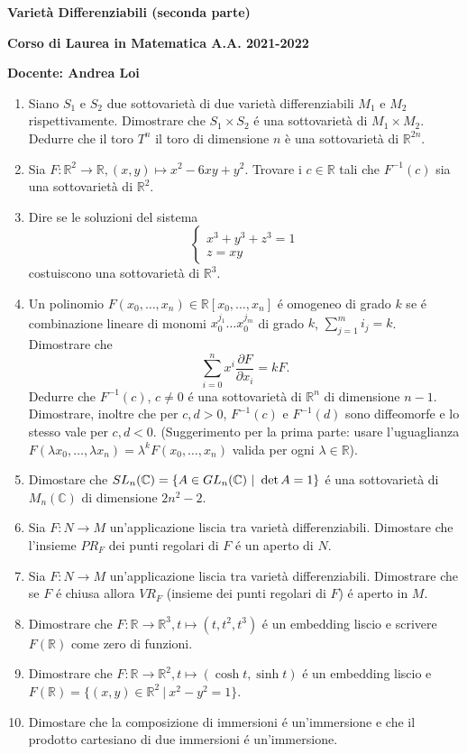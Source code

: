 \documentclass[80pt,defrtgr]{report}
\def\det{\mathop{\hbox{det}}}
\newcommand{\R}{\mathbb{R}}
\newcommand{\complex}{\mathbb{C}}
\begin{document}
\centerline{\bf Varietà Differenziabili (seconda parte)}

\centerline{\bf Corso di Laurea in Matematica A.A. 2021-2022}

\centerline {\bf Docente:
Andrea Loi}



\vspace{0.5cm}
\begin{enumerate}
\item
Siano $S_1$ e $S_2$ due sottovariet\`a di due variet\`a differenziabili $M_1$ e $M_2$ rispettivamente. Dimostrare che $S_1\times S_2$
\'e una sottovariet\`a di $M_1\times M_2$. Dedurre che il toro $T^n$ il toro di dimensione $n$ è una sottovarietà di $\R^{2n}$.
\item
Sia $F:\R^2\rightarrow \R, (x, y)\mapsto x^2-6xy+y^2$. Trovare i $c\in\R$ tali che $F^{-1}(c)$ sia una sottovariet\`a di $\R^2$.
\item
Dire se le soluzioni del sistema 
$$\left\{ \begin{array}{l}
 x^3+y^3+z^3=1\\
z=xy
\end{array}\right.$$
costuiscono una sottovariet\`a di $\R^3$. 
\item
Un  polinomio $F(x_0, \dots , x_n)\in \R[x_0, \dots , x_n]$ \'e omogeneo di grado $k$ se \'e combinazione lineare
di monomi $x_0^{j_1}\dots x_0^{j_m}$ di grado $k$, $\sum_{j=1}^mi_j=k$.
Dimostrare che
$$\sum_{i=0}^nx^i\frac{\partial F}{\partial x_i}=kF.$$
Dedurre che $F^{-1}(c)$, $c\neq  0$ \'e una sottovariet\`a di $\R^n$
di dimensione $n-1$.
Dimostrare, inoltre che per $c, d>0$, $F^{-1}(c)$ e $F^{-1}(d)$ sono diffeomorfe e lo stesso vale per $c, d<0$.
(Suggerimento per la prima parte: usare l'uguaglianza $F(\lambda x_0, \dots , \lambda x_n)=\lambda^kF(x_0, \dots , x_n)$ valida per ogni $\lambda\in\R$).
\item
Dimostare che
 $SL_n(\complex)=\{A\in GL_n(\complex) \ | \ \det A=1\}$
 \'e una sottovariet\`a di $M_n(\complex)$ di dimensione $2n^2-2$. 
 \item
 Sia $F:N\rightarrow M$ un'applicazione liscia tra varietà differenziabili. Dimostare che l'insieme  $PR_F$ dei punti regolari di $F$ \'e un aperto di $N$.
 \item
 Sia $F:N\rightarrow M$ un'applicazione liscia tra varietà differenziabili. Dimostrare che se $F$ \'e chiusa allora $VR_F$ (insieme dei punti regolari di $F$) \'e aperto in $M$.
 \item
 Dimostrare che  $F:\R\rightarrow \R^3, t\mapsto (t, t^2, t^3)$ \'e un embedding liscio  e scrivere $F(\R)$ come zero di funzioni.
 \item
 Dimostrare che  $F:\R\rightarrow \R^2, t\mapsto (\cosh t, \sinh t)$ \'e un embedding liscio  e $F(\R)=\{(x, y)\in\R^2 \ | \ x^2-y^2=1\}$.
 \item
 Dimostare che la composizione di immersioni \'e un'immersione e che il prodotto cartesiano di due immersioni \'e un'immersione.


\end{enumerate}
\end{document}
